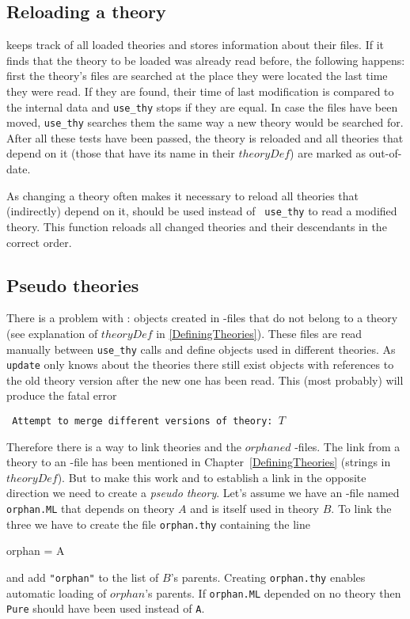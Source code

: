 \subsection{Reloading a theory}

 keeps track of all loaded theories and stores information
about their files.  If it finds that the theory to be loaded was already read
before, the following happens: first the theory's files are searched at the
place they were located the last time they were read. If they are found, their
time of last modification is compared to the internal data and {\tt use_thy}
stops if they are equal. In case the files have been moved, {\tt use_thy}
searches them the same way a new theory would be searched for.  After all these
tests have been passed, the theory is reloaded and all theories that depend on
it (those that have its name in their $theoryDef$) are marked as out-of-date.

As changing a theory often makes it necessary to reload all theories that
(indirectly) depend on it,  should be used instead of {\tt
use_thy} to read a modified theory.  This function reloads all changed
theories and their descendants in the correct order.


\subsection{Pseudo theories}

There is a problem with : objects created in \ML-files that do
not belong to a theory (see explanation of $theoryDef$ in
\ref{DefiningTheories}).  These files are read manually between {\tt use_thy}
calls and define objects used in different theories.  As {\tt update} only
knows about the theories there still exist objects with references to the old
theory version after the new one has been read.  This (most probably) will
produce the fatal error
\begin{center} \tt
Attempt to merge different versions of theory: $T$
\end{center}

Therefore there is a way to link theories and the $orphaned$ \ML-files. The
link from a theory to an \ML-file has been mentioned in
Chapter~\ref{DefiningTheories} (strings in $theoryDef$).  But to make this
work and to establish a link in the opposite direction we need to create a
{\it pseudo theory}.  Let's assume we have an \ML-file named {\tt orphan.ML}
that depends on theory $A$ and is itself used in theory $B$.  To link the
three we have to create the file {\tt orphan.thy} containing the line
\begin{ttbox}
orphan = A
\end{ttbox}
and add {\tt "orphan"} to the list of $B$'s parents.
Creating {\tt orphan.thy} enables automatic loading of $orphan$'s parents.
If {\tt orphan.ML} depended on no theory then {\tt Pure} should have been
used instead of {\tt A}.

